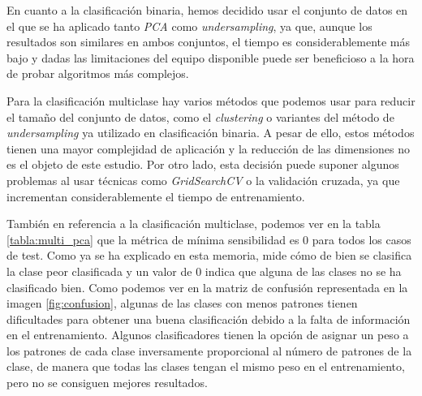En cuanto a la clasificación binaria, hemos decidido usar el conjunto de datos en el que se ha aplicado tanto \textit{PCA} como \textit{undersampling}, ya que, aunque los resultados son similares en ambos conjuntos, el tiempo es considerablemente más bajo y dadas las limitaciones del equipo disponible puede ser beneficioso a la hora de probar algoritmos más complejos.

\vspace{1em}

Para la clasificación multiclase hay varios métodos que podemos usar para reducir el tamaño del conjunto de datos, como el \textit{clustering} o variantes del método de \textit{undersampling} ya utilizado en clasificación binaria. A pesar de ello, estos métodos tienen una mayor complejidad de aplicación y la reducción de las dimensiones no es el objeto de este estudio. Por otro lado, esta decisión puede suponer algunos problemas al usar técnicas como \textit{GridSearchCV} o la validación cruzada, ya que incrementan considerablemente el tiempo de entrenamiento.

\vspace{1em}

También en referencia a la clasificación multiclase, podemos ver en la tabla \ref{tabla:multi_pca} que la métrica de mínima sensibilidad es 0 para todos los casos de test. Como ya se ha explicado en esta memoria, mide cómo de bien se clasifica la clase peor clasificada y un valor de 0 indica que alguna de las clases no se ha clasificado bien. Como podemos ver en la matriz de confusión representada en la imagen \ref{fig:confusion}, algunas de las clases con menos patrones tienen dificultades para obtener una buena clasificación debido a la falta de información en el entrenamiento. Algunos clasificadores tienen la opción de asignar un peso a los patrones de cada clase inversamente proporcional al número de patrones de la clase, de manera que todas las clases tengan el mismo peso en el entrenamiento, pero no se consiguen mejores resultados. 

